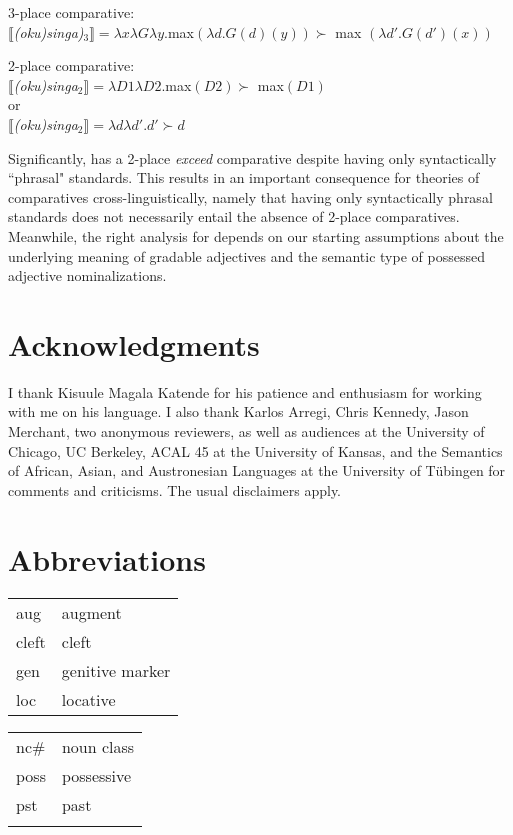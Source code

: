 \documentclass[output=paper,
modfonts
]{langscibook}
\begin{document}
\begin{exe}
\ex\label{concl1}
 3-place comparative: \\
 $\llbracket${\it(oku)singa)}$_3\rrbracket =  \lambda x\lambda G\lambda y.$max$(\lambda d.G(d)(y))\succ$ max $(\lambda d'.G(d')(x))$  

\ex\label{concl2}
 2-place comparative: \\
$\llbracket${\it(oku)singa}$_2$$\rrbracket = \lambda D1\lambda D2.$max$(D2) \succ $ max$(D1)$ \\ or \\
$\llbracket${\it(oku)singa}$_2$$\rrbracket = \lambda d\lambda d'.d' \succ d$
\end{exe}



Significantly,  has a 2-place {\it exceed} comparative despite having only syntactically ``phrasal" standards. This results in an important consequence for theories of comparatives cross-linguistically, namely that having only syntactically phrasal standards does not necessarily entail the absence of 2-place comparatives. Meanwhile, the right analysis for  depends on our starting assumptions about the underlying meaning of gradable adjectives and the semantic type of possessed adjective nominalizations.





\section*{Acknowledgments}

I thank Kisuule Magala Katende for his patience and enthusiasm for working with me on his language. I also thank Karlos Arregi, Chris Kennedy, Jason Merchant, two anonymous reviewers, as well as audiences at the University of Chicago, UC Berkeley, ACAL 45 at the University of Kansas, and the Semantics of African, Asian, and Austronesian Languages at the University of T\"ubingen for comments and criticisms. The usual disclaimers apply.



\section*{Abbreviations}

\begin{tabularx}{.45\textwidth}{lQ}
{\sc aug} & augment\\
{\sc cleft} & cleft\\
{\sc gen} & genitive marker\\
{\sc loc} & locative\\
\end{tabularx}
\begin{tabularx}{.45\textwidth}{lQ}
{\sc nc}\# &  {noun class}\\
{\sc poss} & possessive\\
{\sc pst} & past\\
\\
\end{tabularx}


 








{\sloppy
\printbibliography[heading=subbibliography,notkeyword=this]
}
\end{document}
